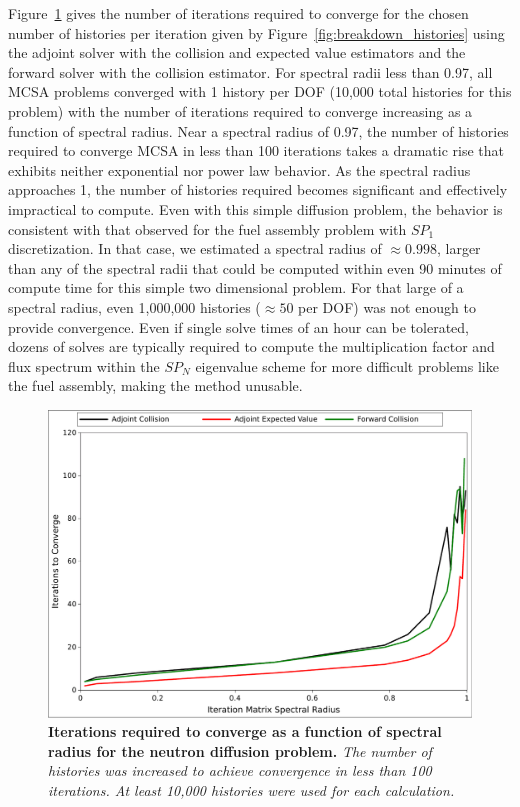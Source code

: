 Figure~\ref{fig:breakdown_iterations} gives the number of iterations
required to converge for the chosen number of histories per iteration
given by Figure~\ref{fig:breakdown_histories} using the adjoint solver
with the collision and expected value estimators and the forward
solver with the collision estimator. For spectral radii less than
0.97, all MCSA problems converged with 1 history per DOF (10,000 total
histories for this problem) with the number of iterations required to
converge increasing as a function of spectral radius. Near a spectral
radius of 0.97, the number of histories required to converge MCSA in
less than 100 iterations takes a dramatic rise that exhibits neither
exponential nor power law behavior. As the spectral radius approaches
1, the number of histories required becomes significant and
effectively impractical to compute. Even with this simple diffusion
problem, the behavior is consistent with that observed for the fuel
assembly problem with $SP_1$ discretization. In that case, we
estimated a spectral radius of $\approx 0.998$, larger than any of the
spectral radii that could be computed within even 90 minutes of
compute time for this simple two dimensional problem. For that large
of a spectral radius, even 1,000,000 histories ($\approx 50$ per DOF)
was not enough to provide convergence. Even if single solve times of
an hour can be tolerated, dozens of solves are typically required to
compute the multiplication factor and flux spectrum within the $SP_N$
eigenvalue scheme for more difficult problems like the fuel assembly,
making the method unusable.
\begin{figure}[t!]
  \begin{center}
    \includegraphics[width=4.5in]{chapters/spn_equations/breakdown_iterations.pdf}
  \end{center}
  \caption{\textbf{Iterations required to converge as a function of
      spectral radius for the neutron diffusion problem.} \textit{The
      number of histories was increased to achieve convergence in less
      than 100 iterations. At least 10,000 histories were used for
      each calculation.}}
  \label{fig:breakdown_iterations}
\end{figure}
